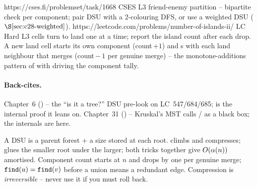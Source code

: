 \begin{practiceset}
    {https://cses.fi/problemset/task/1668}
    {CSES L3}
    {friend-enemy partition -- bipartite check per component; pair DSU with a
     2-colouring DFS, or use a weighted DSU (\(\secref{c28-weighted}\)).}
    {https://leetcode.com/problems/number-of-islands-ii/}
    {LC Hard L3}
    {cells turn to land one at a time; report the island count after each drop.  A
     new land cell starts its own component (count\,+\(1\)) and s with
     each land neighbour that merges (count\,\(-\,1\) per genuine merge) -- the
     monotone-additions pattern of  with  driving the
     component tally.}
\end{practiceset}

\paragraph{Back-cites.}
Chapter~6 () -- the ``is it a tree?'' DSU pre-look on LC~547/684/685;
 is the internal proof it leans on.
Chapter~31 () -- Kruskal's MST calls / as a
black box; the internals are here.

\begin{recallbox}
A DSU is a parent forest + a size stored at each root.   climbs and
compresses;  glues the smaller root under the larger; both tricks
together give \(O(\alpha(n))\) amortised.  Component count starts at \(n\)
and drops by one per genuine merge; \(\texttt{find}(u)=\texttt{find}(v)\) before a
union means a redundant edge.  Compression is \emph{irreversible} -- never use
it if you must roll back.
\end{recallbox}
